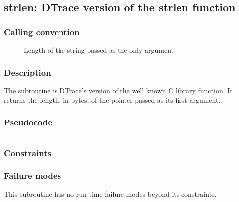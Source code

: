 \clearpage
{}
{}
\label{insn:dummy}
\subsection*{strlen: DTrace version of the strlen function}

\subsubsection*{Calling convention}

\begin{description}
\item[] Length of the string passed as the only argument
\end{description}

\subsubsection*{Description}

The  subroutine is DTrace's version of the well
known C library function.  It returns the length, in bytes, of the
pointer passed as its first argument.

\subsubsection*{Pseudocode}

\begin{verbatim}
\end{verbatim}

\subsubsection*{Constraints}

\subsubsection*{Failure modes}

This subroutine has no run-time failure modes beyond its constraints.
